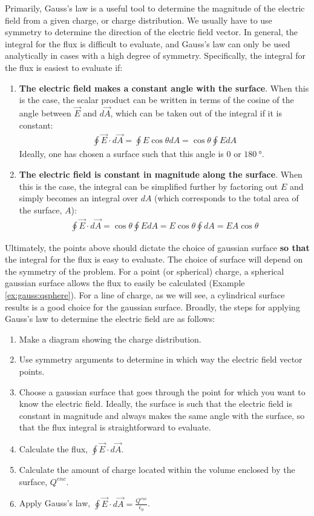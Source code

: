 Primarily, Gauss's law is a useful tool to determine the magnitude of the electric field from a given charge, or charge distribution. We usually have to use symmetry to determine the direction of the electric field vector. In general, the integral for the flux is difficult to evaluate, and Gauss's law can only be used analytically in cases with a high degree of symmetry. Specifically, the integral for the flux is easiest to evaluate if:
\begin{enumerate}
\item \textbf{The electric field makes a constant angle with the surface}. When this is the case, the scalar product can be written in terms of the cosine of the angle between $\vec E$ and $d\vec A$, which can be taken out of the integral if it is constant:
\begin{align*}
\oint \vec E\cdot d\vec A=\oint E\cos\theta dA=\cos\theta\oint EdA
\end{align*}
Ideally, one has chosen a surface such that this angle is $0$ or $\SI{180}{\degree}$.
\item \textbf{The electric field is constant in magnitude along the surface}. When this is the case, the integral can be simplified further by factoring out $E$ and simply becomes an integral over $dA$ (which corresponds to the total area of the surface, $A$):
\begin{align*}
\oint \vec E\cdot d\vec A=\cos\theta\oint EdA =E\cos\theta\oint dA=EA\cos\theta 
\end{align*}
\end{enumerate}
Ultimately, the points above should dictate the choice of gaussian surface \textbf{so that} the integral for the flux is easy to evaluate. The choice of surface will depend on the symmetry of the problem. For a point (or spherical) charge, a spherical gaussian surface allows the flux to easily be calculated (Example \ref{ex:gauss:qsphere}). For a line of charge, as we will see, a cylindrical surface results is a good choice for the gaussian surface. Broadly, the steps for applying Gauss's law to determine the electric field are as follows:
\begin{enumerate}
\item Make a diagram showing the charge distribution.
\item Use symmetry arguments to determine in which way the electric field vector points.
\item Choose a gaussian surface that goes through the point for which you want to know the electric field. Ideally, the surface is such that the electric field is constant in magnitude and always makes the same angle with the surface, so that the flux integral is straightforward to evaluate.
\item Calculate the flux, $\oint \vec E\cdot d\vec A$.
\item Calculate the amount of charge located within the volume enclosed by the surface, $Q^{enc}$.
\item Apply Gauss's law,  $\oint \vec E\cdot d\vec A=\frac{Q^{enc}}{\epsilon_0} $.
\end{enumerate}
